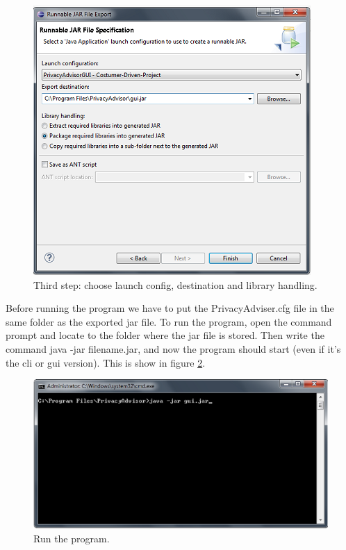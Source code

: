 \begin{centering}
  \begin{figure}
    \includegraphics{Documentation/export_last.png}
    \caption{Third step: choose launch config, destination and library handling.}
    \label{exportLastStep}
  \end{figure}
\end{centering}

Before running the program we have to put the PrivacyAdviser.cfg file in the same folder as the exported jar file. To run the program, open the command prompt and locate to the folder where the jar file is stored. Then write the command java -jar filename.jar, and now the program should start (even if it's the cli or gui version). This is show in figure \ref{runProgram}.

\begin{centering}
  \begin{figure}
    \includegraphics{Documentation/run.png}
    \caption{Run the program.}
    \label{runProgram}
  \end{figure}
\end{centering}

